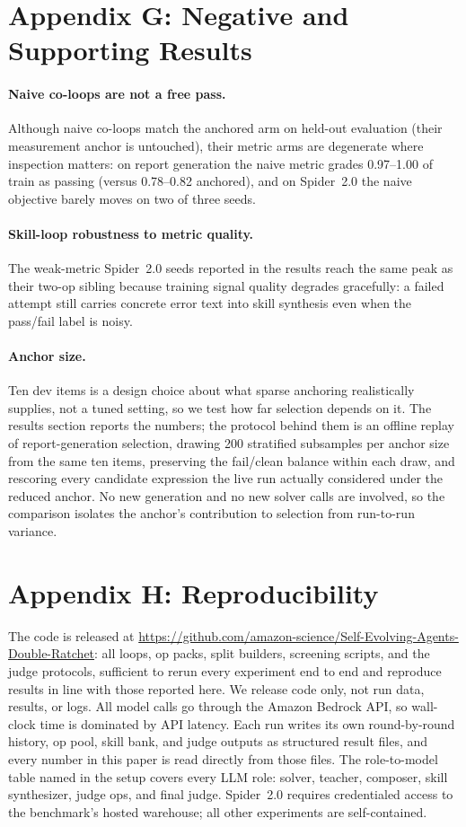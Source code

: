 \documentclass[letterpaper]{article} %
\begin{document}
\section{Appendix G: Negative and Supporting Results}
\label{app:negative}

\paragraph{Naive co-loops are not a free pass.}
Although naive co-loops match the anchored arm on held-out evaluation (their measurement anchor is untouched), their metric arms are degenerate where inspection matters: on report generation the naive metric grades 0.97--1.00 of train as passing (versus 0.78--0.82 anchored), and on Spider~2.0 the naive objective barely moves on two of three seeds.

\paragraph{Skill-loop robustness to metric quality.}
The weak-metric Spider~2.0 seeds reported in the results reach the same peak as their two-op sibling because training signal quality degrades gracefully: a failed attempt still carries concrete error text into skill synthesis even when the pass/fail label is noisy.

\paragraph{Anchor size.}
Ten dev items is a design choice about what sparse anchoring realistically supplies, not a tuned setting, so we test how far selection depends on it. The results section reports the numbers; the protocol behind them is an offline replay of report-generation selection, drawing 200 stratified subsamples per anchor size from the same ten items, preserving the fail/clean balance within each draw, and rescoring every candidate expression the live run actually considered under the reduced anchor. No new generation and no new solver calls are involved, so the comparison isolates the anchor's contribution to selection from run-to-run variance.

\section{Appendix H: Reproducibility}
\label{app:repro}

The code is released at \url{https://github.com/amazon-science/Self-Evolving-Agents-Double-Ratchet}: all loops, op packs, split builders, screening scripts, and the judge protocols, sufficient to rerun every experiment end to end and reproduce results in line with those reported here. We release code only, not run data, results, or logs. All model calls go through the Amazon Bedrock API, so wall-clock time is dominated by API latency. Each run writes its own round-by-round history, op pool, skill bank, and judge outputs as structured result files, and every number in this paper is read directly from those files. The role-to-model table named in the setup covers every LLM role: solver, teacher, composer, skill synthesizer, judge ops, and final judge. Spider~2.0 requires credentialed access to the benchmark's hosted warehouse; all other experiments are self-contained.
\end{document}
